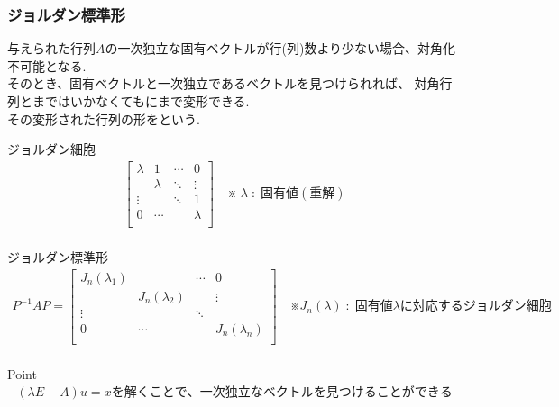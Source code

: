 \documentclass[a4paper]{jsarticle}
\begin{document}
\subsubsection{ジョルダン標準形}
与えられた行列$A$の一次独立な固有ベクトルが行(列)数より少ない場合、対角化不可能となる.\\
そのとき、固有ベクトルと一次独立であるベクトルを見つけられれば、
対角行列とまではいかなくてもにまで変形できる.\\
その変形された行列の形をという.
\begin{itembox}[l]{ジョルダン細胞}
    \begin{eqnarray*}
        \begin{bmatrix}
            \lambda & 1       & \cdots & 0       \\
                    & \lambda & \ddots & \vdots  \\
            \vdots  &         & \ddots & 1       \\
            0       & \cdots  &        & \lambda \\
        \end{bmatrix}
        \quad ※\; \lambda\; :\; 固有値(重解)\\
    \end{eqnarray*}
\end{itembox}
\begin{itembox}[l]{ジョルダン標準形}
    \begin{eqnarray*}
        P^{-1}AP
        =
        \begin{bmatrix}
            J_n\left(\lambda_1\right) &                           & \cdots & 0                         \\
                                      & J_n\left(\lambda_2\right) &        & \vdots                    \\
            \vdots                    &                           & \ddots &                           \\
            0                         & \cdots                    &        & J_n\left(\lambda_n\right) \\
        \end{bmatrix}
        \quad ※ J_n\left(\lambda\right)\; :\; 固有値 \lambda に対応するジョルダン細胞 \\
    \end{eqnarray*}
\end{itembox}
\begin{itembox}[l]{Point}
    \begin{eqnarray*}
        \left(\lambda E - A\right) u=x を解くことで、一次独立なベクトルを見つけることができる\\
    \end{eqnarray*}
\end{itembox}
\end{document}
